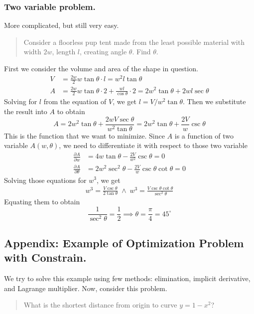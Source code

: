 \documentclass[../main.tex]{subfiles}
\begin{document}
\subsubsection{Two variable problem.} More complicated, but still very easy.
\begin{quotation}
    Consider a floorless pup tent made from the least possible material with width $2w$, length $l$, creating angle $\theta$. Find $\theta$.
\end{quotation}

First we consider the volume and area of the shape in question.
\begin{align*}
    V&=\frac{2w}{2}w\tan \theta\cdot l=w^2l\tan\theta\\
    A&=\frac{2w}{2}w\tan \theta\cdot 2+\frac{wl}{\cos \theta}\cdot 2= 2w^2\tan\theta+2wl\sec \theta
\end{align*}
Solving for $l$ from the equation of $V$, we get $l=V/w^2\tan \theta$. Then we substitute the result into $A$ to obtain
\begin{equation*}
    A=2w^2\tan\theta+\frac{2wV\sec \theta}{w^2\tan\theta}= 2w^2\tan\theta+\frac{2V}{w}\csc\theta
\end{equation*}
This is the function that we want to minimize. Since $A$ is a function of two variable $A(w,\theta)$, we need to differentiate it with respect to those two variable
\begin{align*}
    \frac{\partial A}{\partial w}&=4w\tan \theta-\frac{2V}{w^2}\csc \theta=0\\
    \frac{\partial A}{\partial \theta}&=2w^2\sec^2\theta-\frac{2V}{w}\csc\theta\cot\theta=0
\end{align*}
Solving those equations for $w^3$, we get
\begin{align*}
    w^3=\frac{V\csc\theta}{2\tan\theta}\;\land\; w^3=\frac{V\csc\theta\cot\theta}{\sec^2\theta}
\end{align*}
Equating them to obtain
\begin{equation*}
    \frac{1}{\sec^2\theta}=\frac{1}{2}\implies \theta=\frac{\pi}{4}=45^\circ 
\end{equation*}

\subsection{Appendix: Example of Optimization Problem with Constrain.} 
We try to solve this example using few methods: elimination, implicit derivative, and Lagrange multiplier. Now, consider this problem.
\begin{quotation}
    What is the shortest distance from origin to curve $y=1-x^2$?
\end{quotation} 
\end{document}
